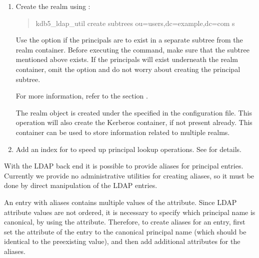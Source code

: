 \documentclass[letterpaper,10pt,english]{sphinxmanual}
\begin{document}
\begin{enumerate}
\item {} 
\sphinxAtStartPar
Create the realm using {\hyperref[\detokenize{admin/admin_commands/kdb5_ldap_util:kdb5-ldap-util-8}]{}}:
\begin{quote}

\sphinxAtStartPar
kdb5\_ldap\_util create \sphinxhyphen{}subtrees ou=users,dc=example,dc=com \sphinxhyphen{}s
\end{quote}

\sphinxAtStartPar
Use the  option if the principals are to exist in a
separate subtree from the realm container.  Before executing the
command, make sure that the subtree mentioned above
 exists.  If the principals will
exist underneath the realm container, omit the  option
and do not worry about creating the principal subtree.

\sphinxAtStartPar
For more information, refer to the section {\hyperref[\detokenize{admin/database:ops-on-ldap}]{}}.

\sphinxAtStartPar
The realm object is created under the
 specified in the configuration
file.  This operation will also create the Kerberos container, if
not present already.  This container can be used to store
information related to multiple realms.

\item {} 
\sphinxAtStartPar
Add an  index for  to speed up principal
lookup operations.  See
 for
details.

\end{enumerate}

\sphinxAtStartPar
With the LDAP back end it is possible to provide aliases for principal
entries.  Currently we provide no administrative utilities for
creating aliases, so it must be done by direct manipulation of the
LDAP entries.

\sphinxAtStartPar
An entry with aliases contains multiple values of the
 attribute.  Since LDAP attribute values are not
ordered, it is necessary to specify which principal name is canonical,
by using the  attribute.  Therefore, to create
aliases for an entry, first set the  attribute of
the entry to the canonical principal name (which should be identical
to the pre\sphinxhyphen{}existing  value), and then add additional
 attributes for the aliases.
\end{document}
